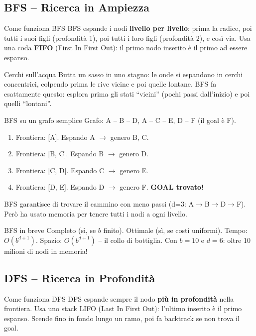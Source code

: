 \documentclass[12pt,a4paper]{article}
\begin{document}
\subsection{BFS -- Ricerca in Ampiezza}

\begin{narrativo}{Come funziona BFS}
BFS espande i nodi \textbf{livello per livello}: prima la radice, poi tutti i suoi figli (profondità 1), poi tutti i loro figli (profondità 2), e così via. Usa una coda \textbf{FIFO} (First In First Out): il primo nodo inserito è il primo ad essere espanso.
\end{narrativo}

\begin{analogia}{Cerchi sull'acqua}
Butta un sasso in uno stagno: le onde si espandono in cerchi concentrici, colpendo prima le rive vicine e poi quelle lontane. BFS fa esattamente questo: esplora prima gli stati ``vicini'' (pochi passi dall'inizio) e poi quelli ``lontani''.
\end{analogia}

\begin{esempio}{BFS su un grafo semplice}
Grafo: A -- B -- D, A -- C -- E, D -- F (il goal è F).
\begin{enumerate}[noitemsep]
  \item Frontiera: [A]. Espando A $\to$ genero B, C.
  \item Frontiera: [B, C]. Espando B $\to$ genero D.
  \item Frontiera: [C, D]. Espando C $\to$ genero E.
  \item Frontiera: [D, E]. Espando D $\to$ genero F. \textbf{GOAL trovato!}
\end{enumerate}
BFS garantisce di trovare il cammino con meno passi (d=3: A$\to$B$\to$D$\to$F). Però ha usato memoria per tenere tutti i nodi a ogni livello.
\end{esempio}

\begin{ricorda}{BFS in breve}
Completo (sì, se $b$ finito). Ottimale (sì, se costi uniformi). Tempo: $O(b^{d+1})$. Spazio: $O(b^{d+1})$ -- il collo di bottiglia. Con $b=10$ e $d=6$: oltre 10 milioni di nodi in memoria!
\end{ricorda}

\subsection{DFS -- Ricerca in Profondità}

\begin{narrativo}{Come funziona DFS}
DFS espande sempre il nodo \textbf{più in profondità} nella frontiera. Usa uno stack LIFO (Last In First Out): l'ultimo inserito è il primo espanso. Scende fino in fondo lungo un ramo, poi fa backtrack se non trova il goal.
\end{narrativo}
\end{document}

